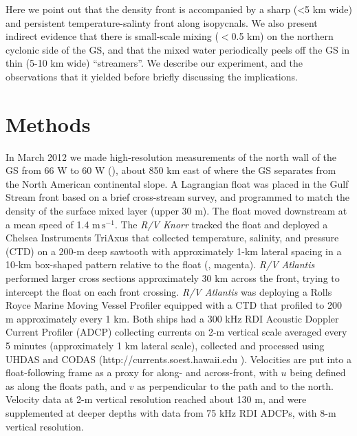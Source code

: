 \documentclass[draft,grl]{agutex2015}
\begin{document}
\begin{article}
Here we point out that the density front is accompanied by a sharp (<5 km wide) and persistent temperature-salinty front along isopycnals.  We also present indirect evidence that there is small-scale mixing ($<$0.5 km) on the northern cyclonic side of the GS, and that the mixed water periodically peels off the GS in thin (5-10 km wide) ``streamers''. We describe our experiment, and the observations that it yielded before briefly discussing the implications.

\section{Methods}

 In March 2012 we made high-resolution measurements of the north wall of the GS from 66 W to 60 W (), about 850 km east of where the GS separates from the North American continental slope.   A Lagrangian float \citep{dasaro03} was placed in the Gulf Stream front based on a brief cross-stream survey, and programmed to match the density of the surface mixed layer (upper 30 m).  The float moved downstream at a mean speed of 1.4 $\mathrm{m\,s^{-1}}$.  The \emph{R/V Knorr} tracked the float and deployed a Chelsea Instruments TriAxus that  collected temperature, salinity, and pressure (CTD) on a 200-m deep sawtooth with approximately 1-km lateral spacing in a 10-km box-shaped pattern relative to the float (, magenta).  \emph{R/V Atlantis} performed larger cross sections approximately 30 km across the front, trying to intercept the float on each front crossing.  \emph{R/V Atlantis} was deploying a Rolls Royce Marine Moving Vessel Profiler equipped with a CTD that profiled to 200 m approximately every 1 km.  Both ships had a 300 kHz RDI Acoustic Doppler Current Profiler (ADCP) collecting currents on 2-m vertical scale averaged every 5 minutes (approximately 1 km lateral scale), collected and processed using UHDAS and CODAS (http://currents.soest.hawaii.edu \cite{firingetal12}).  Velocities are put into a float-following frame as a proxy for along- and across-front, with $u$ being defined as along the floats path, and $v$ as perpendicular to the path and to the north.  Velocity data at 2-m vertical resolution reached about 130 m, and were supplemented at deeper depths with data from 75 kHz RDI ADCPs, with 8-m vertical resolution.  


\end{article}
\end{document}
